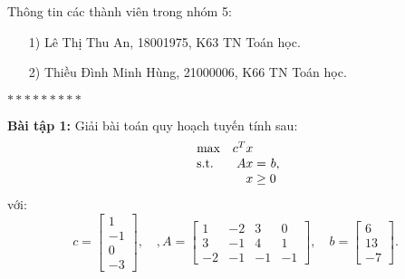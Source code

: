 \documentclass[12pt]{article}
\begin{document}
    Thông tin các thành viên trong nhóm 5:
    \begin{enumerate}
        \item[1)] Lê Thị Thu An, 18001975, K63 TN Toán học.
        \item[2)] Thiều Đình Minh Hùng, 21000006, K66 TN Toán học.
    \end{enumerate}
    \begin{center}
        $*********$
    \end{center}
    \textbf{Bài tập 1: } Giải bài toán quy hoạch tuyến tính sau:
    \begin{equation*}
        \begin{array}{lr@{}c@{}r@{}l}
            \text{max} &c^{T}x\\
            \text{s.t.} & Ax{} & {}={} & b\\
            & x{} & {}\geq{} & {}0
        \end{array},
    \end{equation*}
    với:
    \begin{equation*}
        c = \begin{bmatrix} 
            1 \\ 
            -1 \\ 
            0 \\ 
            -3 
        \end{bmatrix}, \quad, 
        A = \begin{bmatrix} 
            1 & -2 & 3 & 0 \\ 
            3 & -1 & 4 & 1 \\ 
            -2 & -1 & -1 & -1
        \end{bmatrix}, \quad b = \begin{bmatrix} 
            6 \\ 
            13 \\ 
            -7
        \end{bmatrix}.
    \end{equation*}
\end{document}
